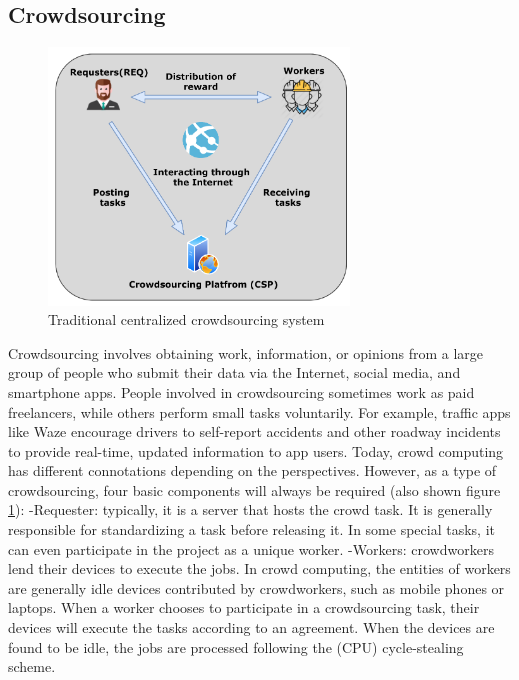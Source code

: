 \documentclass{article}
\begin{document}
\subsection{Crowdsourcing}
\begin{figure}[!ht]
    \centering
    \includegraphics[width=8cm]{assets/Crowdsourcing.PNG}
    \caption{Traditional centralized crowdsourcing system}
    \label{fig:Crowdsourcing}
\end{figure}
Crowdsourcing involves obtaining work, information, or opinions from a large group of people who submit their data via the Internet, social media, and smartphone apps. People involved in crowdsourcing sometimes work as paid freelancers, while others perform small tasks voluntarily. For example, traffic apps like Waze encourage drivers to self-report accidents and other roadway incidents to provide real-time, updated information to app users. Today, crowd computing has different connotations depending on the perspectives. However, as a type of crowdsourcing, four basic components will always be required (also shown figure \ref{fig:Crowdsourcing}):
\newline \newline -Requester: typically, it is a server that hosts the crowd task. It is generally responsible for standardizing a task before releasing it. In some special tasks, it can even participate in the project as a unique worker.
\newline \newline -Workers: crowdworkers lend their devices to execute the jobs. In crowd computing, the entities of workers are generally idle devices contributed by crowdworkers, such as mobile phones or laptops. When a worker chooses to participate in a crowdsourcing task, their devices will execute the tasks according to an agreement. When the devices are found to be idle, the jobs are processed following the (CPU) cycle-stealing scheme.
\end{document}
